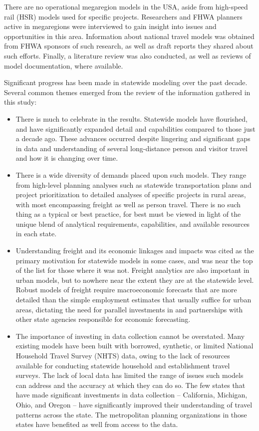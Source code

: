 There are no operational megaregion models in the USA, aside from high-speed rail (HSR) models used for specific projects. Researchers and FHWA planners active in megaregions were interviewed to gain insight into issues and opportunities in this area. Information about national travel models was obtained from FHWA sponsors of such research, as well as draft reports they shared about such efforts. Finally, a literature review was also conducted, as well as reviews of model documentation, where available. 

Significant progress has been made in statewide modeling over the past decade. Several common themes emerged from the review of the information gathered in this study:
\begin{itemize}
\item There is much to celebrate in the results. Statewide models have flourished, and have significantly expanded detail and capabilities compared to those just a decade ago. These advances occurred despite lingering and significant gaps in data and understanding of several long-distance person and visitor travel and how it is changing over time.
\item There is a wide diversity of demands placed upon such models. They range from high-level planning analyses such as statewide transportation plans and project prioritization to detailed analyses of specific projects in rural areas, with most encompassing freight as well as person travel. There is no such thing as a typical or best practice, for best must be viewed in light of the unique blend of analytical requirements, capabilities, and available resources in each state.
\item Understanding freight and its economic linkages and impacts was cited as the primary motivation for statewide models in some cases, and was near the top of the list for those where it was not. Freight analytics are also important in urban models, but to nowhere near the extent they are at the statewide level. Robust models of freight require macroeconomic forecasts that are more detailed than the simple employment estimates that usually suffice for urban areas, dictating the need for parallel investments in and partnerships with other state agencies responsible for economic forecasting. 
\item The importance of investing in data collection cannot be overstated. Many existing models have been built with borrowed, synthetic, or limited National Household Travel Survey (NHTS) data, owing to the lack of resources available for conducting statewide household and establishment travel surveys. The lack of local data has limited the range of issues such models can address and the accuracy at which they can do so. The few states that have made significant investments in data collection -- California, Michigan, Ohio, and Oregon -- have significantly improved their understanding of travel patterns across the state. The metropolitan planning organizations in those states have benefited as well from access to the data.

\end{itemize}
